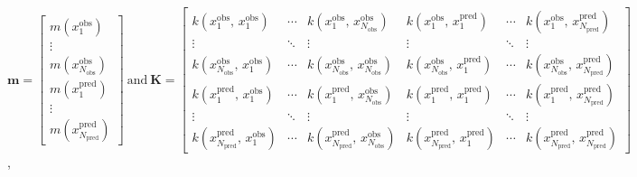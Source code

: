 \documentclass[a4paper, 10pt, fleqn]{article}
\begin{document}
\begin{flushleft}
   \vspace{1em}

   $\mathbf{m} = 
   \begin{bmatrix}
      m(x_{1}^{\text{obs}}) \\
      \vdots \\
      m(x_{N_{\text{obs}}}^{\text{obs}}) \\
      m(x_{1}^{\text{pred}}) \\
      \vdots \\
      m(x_{N_{\text{pred}}}^{\text{pred}})
   \end{bmatrix}  
   \: 
   \text{and}
   \:
   \mathbf{K} = 
   \begin{bmatrix}
      k(x_{1}^{\text{obs}}, \, x_{1}^{\text{obs}}) 
      & \cdots 
      & k(x_{1}^{\text{obs}}, \, x_{N_{\text{obs}}}^{\text{obs}}) 
      & k(x_{1}^{\text{obs}}, \, x_{1}^{\text{pred}}) 
      & \cdots 
      & k(x_{1}^{\text{obs}}, \, x_{N_{\text{pred}}}^{\text{pred}}) \\
      
      \vdots & \ddots & \vdots & \vdots & \ddots & \vdots \\
      
      k(x_{N_{\text{obs}}}^{\text{obs}}, \, x_{1}^{\text{obs}}) 
      & \cdots 
      & k(x_{N_{\text{obs}}}^{\text{obs}}, \, x_{N_{\text{obs}}}^{\text{obs}}) 
      & k(x_{N_{\text{obs}}}^{\text{obs}}, \, x_{1}^{\text{pred}}) 
      & \cdots 
      & k(x_{N_{\text{obs}}}^{\text{obs}}, \, x_{N_{\text{pred}}}^{\text{pred}}) \\
      
      k(x_{1}^{\text{pred}}, \, x_{1}^{\text{obs}}) 
      & \cdots 
      & k(x_{1}^{\text{pred}}, \, x_{N_{\text{obs}}}^{\text{obs}}) 
      & k(x_{1}^{\text{pred}}, \, x_{1}^{\text{pred}}) 
      & \cdots 
      & k(x_{1}^{\text{pred}}, \, x_{N_{\text{pred}}}^{\text{pred}}) \\
      
      \vdots & \ddots & \vdots & \vdots & \ddots & \vdots \\
      
      k(x_{N_{\text{pred}}}^{\text{pred}}, \, x_{1}^{\text{obs}}) 
      & \cdots 
      & k(x_{N_{\text{pred}}}^{\text{pred}}, \, x_{N_{\text{obs}}}^{\text{obs}}) 
      & k(x_{N_{\text{pred}}}^{\text{pred}}, \, x_{1}^{\text{pred}}) 
      & \cdots 
      & k(x_{N_{\text{pred}}}^{\text{pred}}, \, x_{N_{\text{pred}}}^{\text{pred}})
   \end{bmatrix}$,

   \vspace{1em}
   

\end{flushleft}
\end{document}
